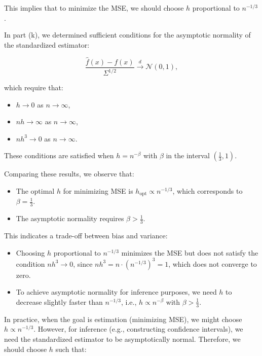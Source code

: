\documentclass{article}
\begin{document}
This implies that to minimize the MSE, we should choose \( h \) proportional to \( n^{-1/3} \).

In part (k), we determined sufficient conditions for the asymptotic normality of the standardized estimator:

\[
\frac{\hat{f}(x) - f(x)}{\Sigma^{1/2}} \xrightarrow{d} \mathcal{N}(0, 1),
\]

which require that:

\begin{itemize}
    \item \( h \to 0 \) as \( n \to \infty \),
    \item \( n h \to \infty \) as \( n \to \infty \),
    \item \( n h^3 \to 0 \) as \( n \to \infty \).
\end{itemize}

These conditions are satisfied when \( h = n^{-\beta} \) with \( \beta \) in the interval \( \left( \frac{1}{3}, 1 \right) \).

Comparing these results, we observe that:

\begin{itemize}
    \item The optimal \( h \) for minimizing MSE is \( h_{\text{opt}} \propto n^{-1/3} \), which corresponds to \( \beta = \frac{1}{3} \).
    \item The asymptotic normality requires \( \beta > \frac{1}{3} \).
\end{itemize}

This indicates a trade-off between bias and variance:

\begin{itemize}
    \item Choosing \( h \) proportional to \( n^{-1/3} \) minimizes the MSE but does not satisfy the condition \( n h^3 \to 0 \), since \( n h^3 = n \cdot (n^{-1/3})^3 = 1 \), which does not converge to zero.
    \item To achieve asymptotic normality for inference purposes, we need \( h \) to decrease slightly faster than \( n^{-1/3} \), i.e., \( h \propto n^{-\beta} \) with \( \beta > \frac{1}{3} \).
\end{itemize}

In practice, when the goal is estimation (minimizing MSE), we might choose \( h \propto n^{-1/3} \). However, for inference (e.g., constructing confidence intervals), we need the standardized estimator to be asymptotically normal. Therefore, we should choose \( h \) such that:
\end{document}
